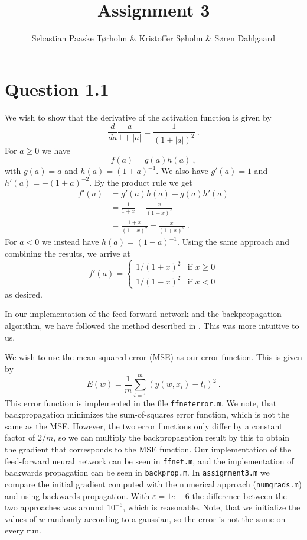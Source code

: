 \documentclass[11pt,a4paper]{article}
\title{Assignment 3}
\author{Sebastian Paaske Tørholm \& Kristoffer Søholm \& Søren Dahlgaard}
\newcommand{\mono}[1]{\texttt{#1}}
\begin{document}
\maketitle

\section{Question 1.1}

We wish to show that the derivative of the activation function is given by
\[
    \frac{d}{da} \frac{a}{1+|a|} = \frac{1}{(1+|a|)^2}\ .
\]
For $a\ge 0$ we have
\[
    f(a) = g(a)h(a)\ ,
\]
with $g(a) = a$ and $h(a) = (1+a)^{-1}$. We also have $g'(a) = 1$ and
$h'(a) = -(1+a)^{-2}$. By the product rule we get
\begin{align}
    f'(a) &= g'(a)h(a) + g(a)h'(a) \\
          &= \frac{1}{1+x} - \frac{x}{(1+x)^2} \\
          &= \frac{1+x}{(1+x)^2} - \frac{x}{(1+x)^2}\ .
\end{align}
For $a < 0$ we instead have $h(a) = (1-a)^{-1}$. Using the same approach and
combining the results, we arrive at
\[
    f'(a) =
    \begin{cases}
        1/(1+x)^2 & \text{if $x\ge 0$} \\
        1/(1-x)^2 & \text{if $x < 0$}
    \end{cases}
\]
as desired.

In our implementation of the feed forward network and the backpropagation
algorithm, we have followed the method described in \cite{ufldl}. This was
more intuitive to us.

We wish to use the mean-squared error (MSE) as our error function. This is
given by
\[
    E(w) = \frac{1}{m} \sum_{i=1}^m (y(w, x_i) - t_i)^2\ .
\]
This error function is implemented in the file \mono{ffneterror.m}. We note,
that backpropagation minimizes the sum-of-squares error function, which is
not the same as the MSE. However, the two error functions only differ by a
constant factor of $2/m$, so we can multiply the backpropagation result by
this to obtain the gradient that corresponds to the MSE function. Our
implementation of the feed-forward neural network can be seen in
\mono{ffnet.m}, and the implementation of backwards propagation can be seen
in \mono{backprop.m}. In \mono{assignment3.m} we compare the initial gradient
computed with the numerical approach (\mono{numgrads.m}) and using backwards
propagation. With $\varepsilon = 1e-6$ the difference between the two
approaches was around $10^{-6}$, which is reasonable. Note, that we initialize
the values of $w$ randomly according to a gaussian, so the error is not the
same on every run.
\end{document}
